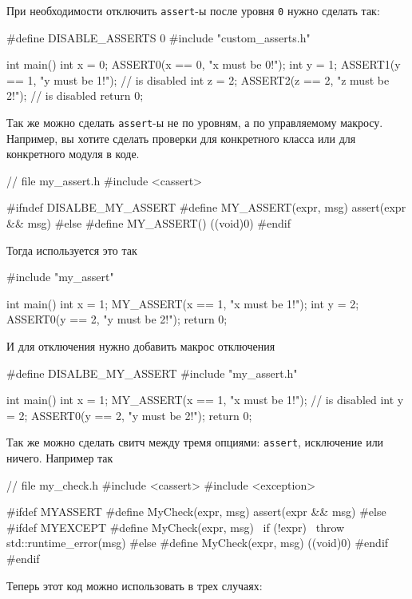 При необходимости отключить \verb"assert"-ы после уровня \verb"0" нужно сделать так:
\begin{cppcode}
#define DISABLE_ASSERTS 0
#include "custom_asserts.h"

int main() {
  int x = 0;
  ASSERT0(x == 0, "x must be 0!");
  int y = 1;
  ASSERT1(y == 1, "y must be 1!"); // is disabled
  int z = 2;
  ASSERT2(z == 2, "z must be 2!"); // is disabled
  return 0;
}
\end{cppcode}
Так же можно сделать \verb"assert"-ы не по уровням, а по управляемому макросу.
Например, вы хотите сделать проверки для конкретного класса или для конкретного модуля в коде.
\begin{cppcode}
// file my_assert.h
#include <cassert>

#ifndef DISALBE_MY_ASSERT
#define MY_ASSERT(expr, msg) assert(expr && msg)
#else
#define MY_ASSERT() ((void)0)
#endif
\end{cppcode}
Тогда используется это так
\begin{cppcode}
#include "my_assert"

int main() {
  int x = 1;
  MY_ASSERT(x == 1, "x must be 1!");
  int y = 2;
  ASSERT0(y == 2, "y must be 2!");
  return 0;
}
\end{cppcode}
И для отключения нужно добавить макрос отключения
\begin{cppcode}
#define DISALBE_MY_ASSERT
#include "my_assert.h"

int main() {
  int x = 1;
  MY_ASSERT(x == 1, "x must be 1!"); // is disabled
  int y = 2;
  ASSERT0(y == 2, "y must be 2!");
  return 0;
}
\end{cppcode}
Так же можно сделать свитч между тремя опциями: \verb"assert", исключение или ничего.
Например так
\begin{cppcode}
// file my_check.h
#include <cassert>
#include <exception>

#ifdef MYASSERT
#define MyCheck(expr, msg) assert(expr && msg)
#else
#ifdef MYEXCEPT
#define MyCheck(expr, msg)       \
  if (!expr)                     \
  throw std::runtime_error(msg)
#else
#define MyCheck(expr, msg) ((void)0)
#endif
#endif
\end{cppcode}
Теперь этот код можно использовать в трех случаях:
